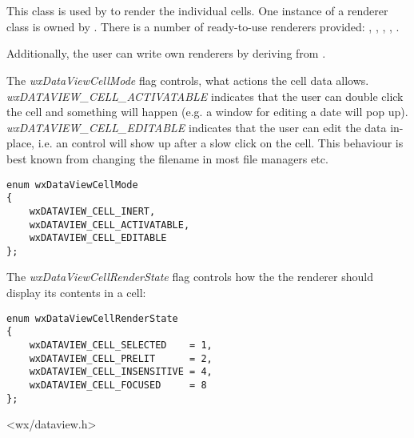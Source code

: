 
\section{}\label{wxdataviewrenderer}


This class is used by  to
render the individual cells. One instance of a renderer class is
owned by . There is
a number of ready-to-use renderers provided:
,
,
,
,
.

Additionally, the user can write own renderers by deriving from
.

The {\it wxDataViewCellMode} flag controls, what actions
the cell data allows. {\it wxDATAVIEW\_CELL\_ACTIVATABLE}
indicates that the user can double click the cell and
something will happen (e.g. a window for editing a date
will pop up). {\it wxDATAVIEW\_CELL\_EDITABLE} indicates
that the user can edit the data in-place, i.e. an control
will show up after a slow click on the cell. This behaviour
is best known from changing the filename in most file 
managers etc.



{\small
\begin{verbatim}
enum wxDataViewCellMode
{
    wxDATAVIEW_CELL_INERT,
    wxDATAVIEW_CELL_ACTIVATABLE,
    wxDATAVIEW_CELL_EDITABLE
};
\end{verbatim}
}

The {\it wxDataViewCellRenderState} flag controls how the
the renderer should display its contents in a cell:

{\small
\begin{verbatim}
enum wxDataViewCellRenderState
{
    wxDATAVIEW_CELL_SELECTED    = 1,
    wxDATAVIEW_CELL_PRELIT      = 2,
    wxDATAVIEW_CELL_INSENSITIVE = 4,
    wxDATAVIEW_CELL_FOCUSED     = 8
};
\end{verbatim}
}





<wx/dataview.h>

